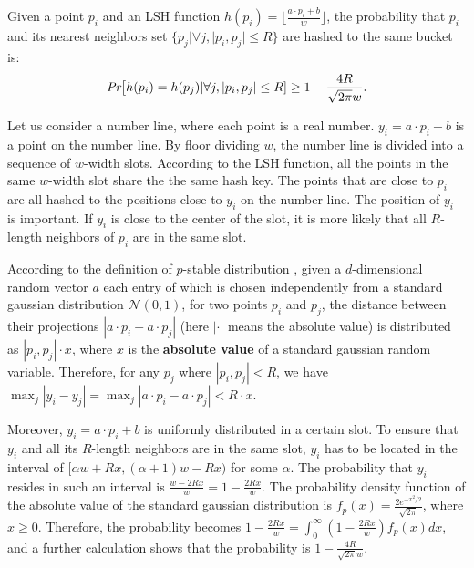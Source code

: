 \begin{lemma}
%
\label{lm:prob1}
%
Given a point $p_i$ and an LSH function $h(p_i)=\lfloor \frac{a\cdot
p_i+b}{w}\rfloor$, the probability that $p_i$ and its nearest neighbors set $\{p_j|\forall j, |p_i,p_j|\leq R\}$ are hashed to the same bucket is:
%
\begin{equation}\label{eq:lm:prob1}
%
\begin{aligned}
%
  \emph{Pr}\big[h(p_i)=h(p_{j})|\forall j, |p_i,p_j|\leq R] \geq 1-\frac{4R}{\sqrt{2\pi}w}.
%
\end{aligned}
\end{equation}
\end{lemma}
\begin{IEEEproof}

Let us consider a number line, where each point is a real number.
$y_i=a\cdot p_i+b$ is a point on the number line. By floor dividing
$w$, the number line is divided into a sequence of $w$-width slots.
According to the LSH function, all the points in the same $w$-width
slot share the the same hash key.  The points that are close to $p_i$
are all hashed to the positions close to $y_i$ on the number line.  The
position of $y_i$ is important.  If $y_i$ is close to the center of
the slot, it is more likely that all $R$-length neighbors of $p_i$
are in the same slot.

According to the definition of $p$-stable distribution
\cite{datar}, given a $d$-dimensional random
vector $a$ each entry of which is chosen independently from a standard
gaussian distribution $\mathcal{N}(0,1)$, for two points $p_i$ and
$p_j$, the distance between their projections $|a\cdot p_i-a\cdot
p_j|$ (here $|\cdot|$ means the absolute value) is distributed as $|p_i, p_j|\cdot x$, where $x$ is the \textbf{absolute
value} of a standard gaussian random variable. Therefore, for any
$p_j$ where $|p_i, p_j|<R$, we have $\max_{j}|y_i-y_j|=\max_{j}|a\cdot
p_i-a\cdot p_j|<R\cdot x$.
%

Moreover, $y_i=a\cdot p_i+b$ is uniformly distributed in a certain
slot. To ensure that $y_i$ and all its $R$-length neighbors are in
the same slot, $y_i$ has to be located in the interval of $[\alpha
w+Rx,(\alpha+1)w-Rx)$ for some $\alpha$.   The probability that $y_i$ resides in such an
interval is $\frac{w-2Rx}{w}=1-\frac{2Rx}{w}$.
%
The probability density function of the absolute value of the standard
gaussian distribution is $f_p(x)=\frac{2e^{-x^2/2}}{\sqrt{2\pi}}$,
where $x \geq 0$.  Therefore, the probability becomes
$1-\frac{2Rx}{w}=\int_{0}^{\infty}(1-\frac{2Rx}{w})f_p(x)dx$, and
a further calculation shows that the probability is
$1-\frac{4R}{\sqrt{2\pi}w}$.
\end{IEEEproof}

